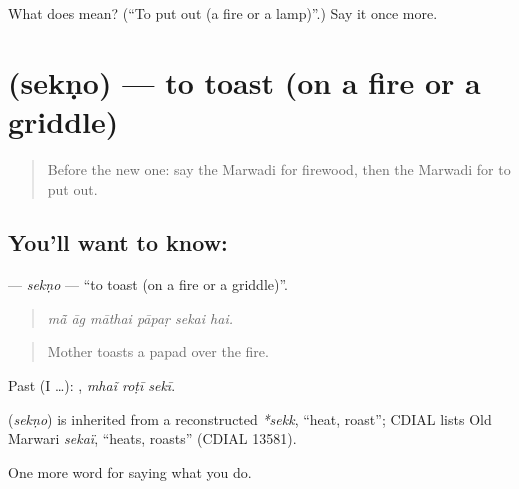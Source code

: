 \begin{tcolorbox}[breakable,colback=teal!4,colframe=teal!35!black,title={Before you move on}]
What does  mean? (\textquotedblleft{}To put out (a fire or a lamp)\textquotedblright{}.) Say it once more.
\end{tcolorbox}
\section[\texorpdfstring{\mw{सेकणो} (sekṇo)}{सेकणो (sekṇo)}]{ (sekṇo) — to toast (on a fire or a griddle)}

\label{lesson:MW-C173-sekno}



\begin{quote}
Before the new one: say the Marwadi for firewood, then the Marwadi for to put out.
\end{quote}

\subsection*{You'll want to know: }
\textbf{} — \emph{sekṇo} — \textquotedblleft{}to toast (on a fire or a griddle)\textquotedblright{}.

\begin{quote}
     
\end{quote}

\begin{quote}
\emph{mā̃ āg māthai pāpaṛ sekai hai.}
\end{quote}

\begin{quote}
Mother toasts a papad over the fire.
\end{quote}

Past (I …):   , \emph{mhaĩ roṭī sekī}.

\begin{cousinweb}
\textbf{} (\emph{sekṇo}) is inherited from a reconstructed \emph{*sekk}, \textquotedblleft{}heat, roast\textquotedblright{}; CDIAL lists Old Marwari \emph{sekaï}, \textquotedblleft{}heats, roasts\textquotedblright{} (CDIAL 13581).
\end{cousinweb}

\begin{grammarlens}[title={What you've built}]
One more word for saying what you do.
\end{grammarlens}

